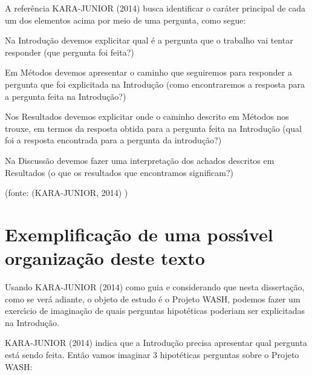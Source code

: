 \documentclass[
12pt,		%
openright,	%
twoside,  %
a4paper,			%
chapter=TITLE,		%
english,			%
french,				%
spanish,			%
brazil				%
]{USPSC-classe/USPSC}
\begin{document}
A refer\^encia KARA-JUNIOR (2014) busca identificar o car\'ater principal de cada um dos elementos acima por meio de uma pergunta, como segue:



\begin{alineas}
\item Na Introdu\c{c}\~ao devemos explicitar qual \'e a pergunta que o trabalho vai tentar responder   (\textquotedbl que pergunta foi feita?\textquotedbl )
\item Em M\'etodos devemos apresentar o caminho que seguiremos para responder a pergunta que foi explicitada na Introdu\c{c}\~ao (\textquotedbl como encontraremos a resposta para a pergunta feita na Introdu\c{c}\~ao?\textquotedbl )
\item Nos Resultados devemos explicitar onde o caminho descrito em M\'etodos nos trouxe, em termos da resposta obtida para a pergunta feita na Introdu\c{c}\~ao (\textquotedbl qual foi a resposta encontrada para a pergunta da introdu\c{c}\~ao?\textquotedbl )
\item Na Discuss\~ao devemos fazer uma interpreta\c{c}\~ao dos achados descritos em Resultados (\textquotedbl o que os resultados que encontramos significam?\textquotedbl )
\end{alineas}

\begin{flushright}
\setlength{\absparsep}{0pt}
\tiny \begin{flushright}
\setlength{\absparsep}{0pt}
\tiny (fonte:  (KARA-JUNIOR, 2014) ) \normalsize 
\end{flushright}

 \normalsize 
\end{flushright}


\section[Exemplifica\c{c}\~ao de uma poss\'{\i}vel organiza\c{c}\~ao deste texto]{Exemplifica\c{c}\~ao de uma poss\'{\i}vel organiza\c{c}\~ao deste texto}\label{Exemplifica\c{c}\~ao de uma poss\'{\i}vel organiza\c{c}\~ao deste texto}
Usando  KARA-JUNIOR (2014) como guia e considerando que nesta disserta\c{c}\~ao, como se ver\'a adiante, o objeto de estudo \'e o Projeto WASH, podemos fazer um exerc\'{\i}cio de imagina\c{c}\~ao de quais perguntas hipot\'eticas poderiam ser explicitadas na Introdu\c{c}\~ao.


 KARA-JUNIOR (2014) indica que a Introdu\c{c}\~ao precisa apresentar qual pergunta est\'a sendo feita. Ent\~ao vamos imaginar 3 hipot\'eticas perguntas sobre o Projeto WASH:
\end{document}
